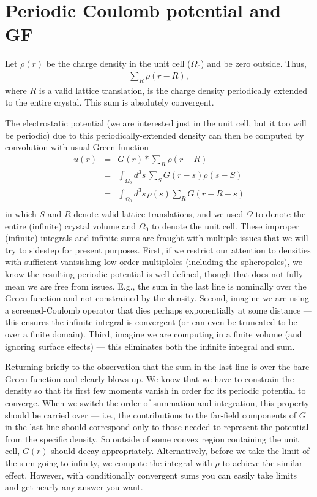 \documentclass[12pt]{article}
\begin{document}
\section{Periodic Coulomb potential and GF}

Let $\rho(r)$ be the charge density in the unit cell ($\Omega_0$) and be zero outside.  Thus,
\begin{eqnarray}
  \sum_R \rho(r-R) ,
\end{eqnarray}
where $R$ is a valid lattice translation, is the charge density periodically extended to the entire crystal.  This sum is absolutely convergent.

The electrostatic potential (we are interested just in the unit cell, but it too will be periodic) due to this periodically-extended density can then be computed by convolution with usual Green function
\begin{eqnarray}
  u(r) & = & G(r) * \sum_R \rho(r-R) \\
  & = & \int_{\Omega_0} \! d^3s \, \sum_S G(r-s) \rho(s-S) \\
  & = & \int_{\Omega_0} \! d^3s \, \rho(s) \sum_R G(r-R-s) \\
\end{eqnarray}
in which $S$ and $R$ denote valid lattice translations, and we used $\Omega$ to denote the entire (infinite) crystal volume and $\Omega_0$ to denote the unit cell.  These improper (infinite) integrals and infinite sums are fraught with multiple issues that we will try to sidestep for present purposes.  First, if we restrict our attention to densities with sufficient vanisishing low-order multiploles (including the spheropoles), we know the resulting periodic potential is well-defined, though that does not fully mean we are free from issues.  E.g., the sum in the last line is nominally over the Green function and not constrained by the density.  Second, imagine we are using a screened-Coulomb operator that dies perhaps exponentially at some distance --- this ensures the infinite integral is convergent (or can even be truncated to be over a finite domain). Third, imagine we are computing in a finite volume (and ignoring surface effects) --- this eliminates both the infinite integral and  sum. 

Returning briefly to the observation that the sum in the last line is over the bare Green function and clearly blows up.  We know that we have to constrain the density so that its first few moments vanish in order for its periodic potential to converge.  When we switch the order of summation and integration, this property should be carried over --- i.e., the contributions to the far-field components of $G$ in the last line should correspond only to those needed to represent the potential from the specific density.  So outside of some convex region containing the unit cell, $G(r)$ should decay appropriately.  Alternatively, before we take the limit of the sum going to infinity, we compute the integral with $\rho$ to achieve the similar effect.  However, with conditionally convergent sums you can easily take limits and get nearly any answer you want.
\end{document}
